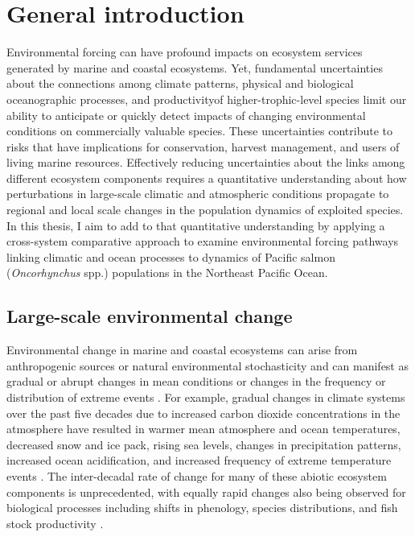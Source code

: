 
\chapter[General introduction]{General introduction}
\label{ch:intro}

Environmental forcing can have profound impacts on ecosystem services generated
by marine and coastal ecosystems. Yet, fundamental uncertainties about the
connections among climate patterns, physical and biological oceanographic
processes, and productivity\footnotemark[1] of higher-trophic-level species
limit our ability to anticipate or quickly detect impacts of changing
environmental conditions on commercially valuable species. These uncertainties
contribute to risks that have implications for conservation, harvest management,
and users of living marine resources. Effectively reducing uncertainties about
the links among different ecosystem components requires a quantitative
understanding about how perturbations in large-scale climatic and atmospheric
conditions propagate to regional and local scale changes in the population
dynamics of exploited species. In this thesis, I aim to add to that quantitative
understanding by applying a cross-system comparative approach to examine
environmental forcing pathways linking climatic and ocean processes to dynamics
of Pacific salmon (\emph{Oncorhynchus} spp.) populations in the Northeast
Pacific Ocean.



\section{Large-scale environmental change}

Environmental change in marine and coastal ecosystems can arise from
anthropogenic sources or natural environmental stochasticity and can manifest as
gradual or abrupt changes in mean conditions or changes in the frequency or
distribution of extreme events \citep{Jentsch2007}. For example, gradual changes
in climate systems over the past five decades due to increased carbon dioxide
concentrations in the atmosphere have resulted in warmer mean atmosphere and
ocean temperatures, decreased snow and ice pack, rising sea levels, changes in
precipitation patterns, increased ocean acidification, and increased frequency
of extreme temperature events \citep{IPCC2013a}. The inter-decadal rate of
change for many of these abiotic ecosystem components is unprecedented, with
equally rapid changes also being observed for biological processes including
shifts in phenology, species distributions, and fish stock productivity
\citep{IPCC2013a, Taylor2008a, Pinsky2013, Peterman2012}.

